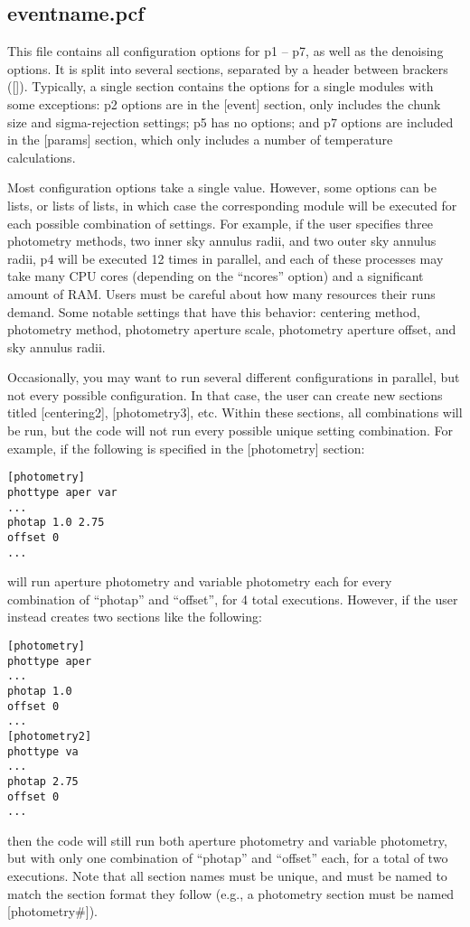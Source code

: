 \documentclass[letterpaper,12pt]{article}
\begin{document}
\subsection{eventname.pcf}

This file contains all configuration options for p1 -- p7, as well as
the denoising options. It is split into several sections, separated by
a header between brackers ([]). Typically, a single section contains
the options for a single modules with some exceptions: p2 options are
in the [event] section, only includes the chunk size and
sigma-rejection settings; p5 has no options; and p7 options are
included in the [params] section, which only includes a number of
temperature calculations.

Most configuration options take a single value. However, some options
can be lists, or lists of lists, in which case the corresponding
module will be executed for each possible combination of settings. For
example, if the user specifies three photometry methods, two inner sky
annulus radii, and two outer sky annulus radii, p4 will be executed 12
times in parallel, and each of these processes may take many CPU cores
(depending on the ``ncores'' option) and a significant amount of
RAM. Users must be careful about how many resources their runs demand.
Some notable settings that have this behavior: centering method,
photometry method, photometry aperture scale, photometry aperture
offset, and sky annulus radii.

Occasionally, you may want to run several different configurations in
parallel, but not every possible configuration. In that case, the user
can create new sections titled [centering2], [photometry3], etc. Within
these sections, all combinations will be run, but the code will not run
every possible unique setting combination. For example, if the following
is specified in the [photometry] section:

\begin{verbatim}
[photometry]
phottype aper var
...
photap 1.0 2.75
offset 0
...
\end{verbatim}

\noindent
will run aperture photometry and variable photometry each for every
combination of ``photap'' and ``offset'', for 4 total executions. However,
if the user instead creates two sections like the following:

\begin{verbatim}
[photometry]
phottype aper
...
photap 1.0
offset 0
...
[photometry2]
phottype va
...
photap 2.75
offset 0
...
\end{verbatim}
\noindent
then the code will still run both aperture photometry and variable
photometry, but with only one combination of ``photap'' and ``offset''
each, for a total of two executions. Note that all section names must
be unique, and must be named to match the section format they follow
(e.g., a photometry section must be named [photometry\#]).
\end{document}
